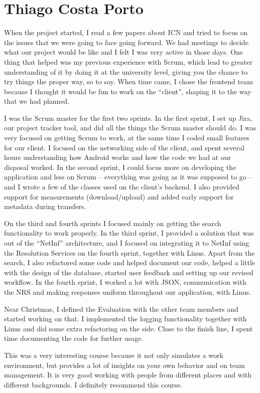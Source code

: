 \section{Thiago Costa Porto}
When the project started, I read a few papers about ICN and tried to focus on the issues that we were going to face going forward. We had meetings to decide what our project would be like and I felt I was very active in those days. One thing that helped was my previous experience with Scrum, which lead to greater understanding of it by doing it at the university level, giving you the chance to try things the proper way, so to say. When time came, I chose the frontend team because I thought it would be fun to work on the ``client'', shaping it to the way that we had planned.

I was the Scrum master for the first two sprints. In the first sprint, I set up Jira, our project tracker tool, and did all the things the Scrum master should do. I was very focused on getting Scrum to work, at the same time I coded small features for our client. I focused on the networking side of the client, and spent several hours understanding how Android works and how the code we had at our disposal worked. In the second sprint, I could focus more on developing the application and less on Scrum -- everything was going as it was supposed to go -- and I wrote a few of the classes used on the client's backend. I also provided support for measurements (download/upload) and added early support for metadata during transfers.

On the third and fourth sprints I focused mainly on getting the search functionality to work properly. In the third sprint, I provided a solution that was out of the ``NetInf'' architecture, and I focused on integrating it to NetInf using the Resolution Services on the fourth sprint, together with Linus. Apart from the search, I also refactored some code and helped document our code, helped a little with the design of the database, started user feedback and setting up our revised workflow. In the fourth sprint, I worked a lot with JSON, communication with the NRS and making responses uniform throughout our application, with Linus.

Near Christmas, I defined the Evaluation with the other team members and started working on that. I implemented the logging functionality together with Linus and did some extra refactoring on the side. Close to the finish line, I spent time documenting the code for further usage.

This was a very interesting course because it not only simulates a work environment, but provides a lot of insights on your own behavior and on team management. It is very good working with people from different places and with different backgrounds. I definitely recommend this course.

